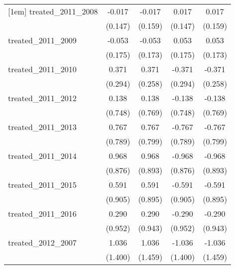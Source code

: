 {\begin{tabular}{l*{4}{c}}
[1em]
treated\_2011\_2008&      -0.017         &      -0.017         &       0.017         &       0.017         \\
            &     (0.147)         &     (0.159)         &     (0.147)         &     (0.159)         \\
[1em]
treated\_2011\_2009&      -0.053         &      -0.053         &       0.053         &       0.053         \\
            &     (0.175)         &     (0.173)         &     (0.175)         &     (0.173)         \\
[1em]
treated\_2011\_2010&       0.371         &       0.371         &      -0.371         &      -0.371         \\
            &     (0.294)         &     (0.258)         &     (0.294)         &     (0.258)         \\
[1em]
treated\_2011\_2012&       0.138         &       0.138         &      -0.138         &      -0.138         \\
            &     (0.748)         &     (0.769)         &     (0.748)         &     (0.769)         \\
[1em]
treated\_2011\_2013&       0.767         &       0.767         &      -0.767         &      -0.767         \\
            &     (0.789)         &     (0.799)         &     (0.789)         &     (0.799)         \\
[1em]
treated\_2011\_2014&       0.968         &       0.968         &      -0.968         &      -0.968         \\
            &     (0.876)         &     (0.893)         &     (0.876)         &     (0.893)         \\
[1em]
treated\_2011\_2015&       0.591         &       0.591         &      -0.591         &      -0.591         \\
            &     (0.905)         &     (0.895)         &     (0.905)         &     (0.895)         \\
[1em]
treated\_2011\_2016&       0.290         &       0.290         &      -0.290         &      -0.290         \\
            &     (0.952)         &     (0.943)         &     (0.952)         &     (0.943)         \\
[1em]
treated\_2012\_2007&       1.036         &       1.036         &      -1.036         &      -1.036         \\
            &     (1.400)         &     (1.459)         &     (1.400)         &     (1.459)         \\

\end{tabular}}
